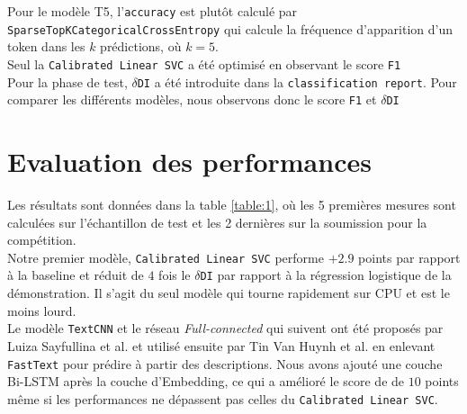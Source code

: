 Pour le modèle T5, l'\texttt{accuracy} est plutôt calculé par \texttt{SparseTopKCategoricalCrossEntropy} qui calcule la fréquence d'apparition d'un token dans les $k$ prédictions, où $k = 5$.\\
Seul la \texttt{Calibrated Linear SVC} a été optimisé en observant le score \texttt{F1}
\hfill\\

Pour la phase de test, $\delta$\texttt{DI} a été introduite dans la \texttt{classification report}. Pour comparer les différents modèles, nous observons donc le score \texttt{F1} et $\delta$\texttt{DI}

\section{Evaluation des performances}
Les résultats sont données dans la table \ref{table:1}, où les 5 premières mesures sont calculées sur l'échantillon de test et les 2 dernières sur la soumission pour la compétition.
\hfill\\

Notre premier modèle, \texttt{Calibrated Linear SVC} performe $+2.9$ points par rapport à la baseline et réduit de $4$ fois le $\delta$\texttt{DI} par rapport à la régression logistique de la démonstration. Il s'agit du seul modèle qui tourne rapidement sur CPU et est le moins lourd.
\hfill\\

Le modèle \texttt{TextCNN} et le réseau \textit{Full-connected} qui suivent ont été proposés par Luiza Sayfullina et al. et utilisé ensuite par Tin Van Huynh et al. en enlevant \texttt{FastText} pour prédire à partir des descriptions. Nous avons ajouté une couche Bi-LSTM après la couche d'Embedding, ce qui a amélioré le score de de $10$ points même si les performances ne dépassent pas celles du \texttt{Calibrated Linear SVC}.

